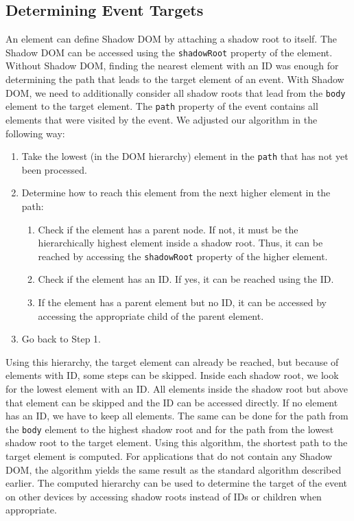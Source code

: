 \subsection{Determining Event Targets}

An element can define Shadow DOM by attaching a shadow root to itself. The Shadow DOM can be accessed using the \lstinline|shadowRoot| property of the element. Without Shadow DOM, finding the nearest element with an ID was enough for determining the path that leads to the target element of an event. With Shadow DOM, we need to additionally consider all shadow roots that lead from the \lstinline|body| element to the target element. The \lstinline|path| property of the event contains all elements that were visited by the event. We adjusted our algorithm in the following way:
\begin{enumerate}
	\item Take the lowest (in the DOM hierarchy) element in the \lstinline|path| that has not yet been processed.
	\item Determine how to reach this element from the next higher element in the path:
	\begin{enumerate}
		\item Check if the element has a parent node. If not, it must be the hierarchically highest element inside a shadow root. Thus, it can be reached by accessing the \lstinline|shadowRoot| property of the higher element.
		\item Check if the element has an ID. If yes, it can be reached using the ID.
		\item If the element has a parent element but no ID, it can be accessed by accessing the appropriate child of the parent element.
	\end{enumerate}
	\item Go back to Step 1.
\end{enumerate}
Using this hierarchy, the target element can already be reached, but because of elements with ID, some steps can be skipped. Inside each shadow root, we look for the lowest element with an ID. All elements inside the shadow root but above that element can be skipped and the ID can be accessed directly. If no element has an ID, we have to keep all elements. The same can be done for the path from the \lstinline|body| element to the highest shadow root and for the path from the lowest shadow root to the target element. Using this algorithm, the shortest path to the target element is computed. For applications that do not contain any Shadow DOM, the algorithm yields the same result as the standard algorithm described earlier. The computed hierarchy can be used to determine the target of the event on other devices by accessing shadow roots instead of IDs or children when appropriate.

